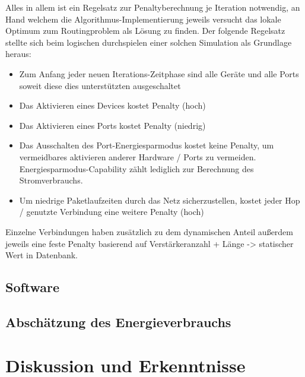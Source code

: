 \documentclass[12pt,titlepage]{article}
\begin{document}
Alles in allem ist ein Regelsatz zur Penaltyberechnung je Iteration notwendig, an Hand welchem die Algorithmus-Implementierung jeweils versucht das lokale Optimum zum Routingproblem als Lösung zu finden.
Der folgende Regelsatz stellte sich beim logischen durchspielen einer solchen Simulation als Grundlage heraus:
\begin{itemize}
	\item Zum Anfang jeder neuen Iterations-Zeitphase sind alle Geräte und alle Ports soweit diese dies unterstützten ausgeschaltet
	\item Das Aktivieren eines Devices kostet Penalty (hoch)
	\item Das Aktivieren eines Ports kostet Penalty (niedrig)
	\item Das Ausschalten des Port-Energiesparmodus kostet keine Penalty, um vermeidbares aktivieren anderer Hardware / Ports zu vermeiden. Energiesparmodus-Capability zählt lediglich zur Berechnung des Stromverbrauchs.
	\item Um niedrige Paketlaufzeiten durch das Netz sicherzustellen, kostet jeder Hop / genutzte Verbindung eine weitere Penalty (hoch)
\end{itemize}
Einzelne Verbindungen haben zusätzlich zu dem dynamischen Anteil außerdem jeweils eine feste Penalty basierend auf Verstärkeranzahl + Länge -> statischer Wert in Datenbank.


\subsection{Software}
\subsection{Abschätzung des Energieverbrauchs}

\section{Diskussion und Erkenntnisse}
\end{document}
